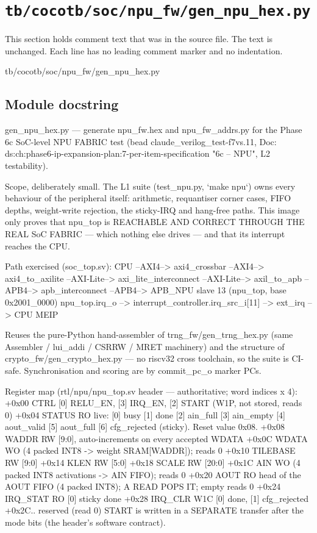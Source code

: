 \section{\texttt{tb/cocotb/soc/npu\_fw/gen\_npu\_hex.py}}\label{tm:suite:soc-npu-fw-gen-npu-hex}

This section holds comment text that was in the source file. The text is unchanged. Each line has no leading comment marker and no indentation.

\begin{relocated}{tb/cocotb/soc/npu_fw/gen_npu_hex.py}

\subsection*{Module docstring}

\begin{textblock}
gen_npu_hex.py — generate npu_fw.hex and npu_fw_addrs.py for the Phase 6c SoC-level NPU FABRIC test
(bead claude_verilog_test-f7vs.11, Doc: ds:ch:phase6-ip-expansion-plan:7-per-item-specification "6c -- NPU", L2 testability).

Scope, deliberately small. The L1 suite (test_npu.py, `make npu`) owns every behaviour of the
peripheral itself: arithmetic, requantiser corner cases, FIFO depths, weight-write rejection, the
sticky-IRQ and hang-free paths. This image only proves that npu_top is REACHABLE AND CORRECT THROUGH
THE REAL SoC FABRIC — which nothing else drives — and that its interrupt reaches the CPU.

Path exercised (soc_top.sv):
CPU --AXI4--> axi4_crossbar --AXI4--> axi4_to_axilite --AXI-Lite-->
axi_lite_interconnect --AXI-Lite--> axil_to_apb --APB4--> apb_interconnect
--APB4--> APB_NPU slave 13 (npu_top, base 0x2001_0000)
npu_top.irq_o --> interrupt_controller.irq_src_i[11] --> ext_irq --> CPU MEIP

Reuses the pure-Python hand-assembler of trng_fw/gen_trng_hex.py (same Assembler / lui_addi /
CSRRW / MRET machinery) and the structure of crypto_fw/gen_crypto_hex.py — no riscv32 cross
toolchain, so the suite is CI-safe. Synchronisation and scoring are by commit_pc_o marker PCs.

Register map (rtl/npu/npu_top.sv header — authoritative; word indices x 4):
+0x00 CTRL     [0] RELU_EN, [3] IRQ_EN, [2] START (W1P, not stored, reads 0)
+0x04 STATUS   RO live: [0] busy [1] done [2] ain_full [3] ain_empty [4] aout_valid
[5] aout_full [6] cfg_rejected (sticky). Reset value 0x08.
+0x08 WADDR    RW [9:0], auto-increments on every accepted WDATA
+0x0C WDATA    WO (4 packed INT8 -> weight SRAM[WADDR]); reads 0
+0x10 TILEBASE RW [9:0]      +0x14 KLEN RW [5:0]      +0x18 SCALE RW [20:0]
+0x1C AIN      WO (4 packed INT8 activations -> AIN FIFO); reads 0
+0x20 AOUT     RO head of the AOUT FIFO (4 packed INT8); A READ POPS IT; empty reads 0
+0x24 IRQ_STAT RO [0] sticky done    +0x28 IRQ_CLR W1C [0] done, [1] cfg_rejected
+0x2C..        reserved (read 0)
START is written in a SEPARATE transfer after the mode bits (the header's software contract).


\end{textblock}
\end{relocated}
